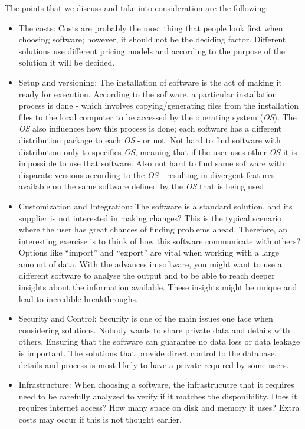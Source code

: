 \documentclass[ppgc,mestrado,English]{iiufrgs}
\begin{document}
The points that we discuss and take into consideration are the following:
\begin{itemize}
\item The costs: Costs are probably the most thing that people look first when choosing software; however, it should not be the deciding factor. Different solutions use different pricing models and according to the purpose of the solution it will be decided.

\item Setup and versioning: The installation of software is the act of making it ready for execution. According to the software, a particular installation process is done - which involves copying/generating files from the installation files to the local computer to be accessed by the operating system (\emph{OS}). The \emph{OS} also influences how this process is done; each software has a different distribution package to each \emph{OS} - or not. Not hard to find software with distribution only to specifics \emph{OS}, meaning that if the user uses other \emph{OS} it is impossible to use that software. Also not hard to find same software with disparate versions according to the \emph{OS} - resulting in divergent features available on the same software defined by the \emph{OS} that is being used.

\item Customization and Integration: The software is a standard solution, and its supplier is not interested in making changes? This is the typical scenario where the user has great chances of finding problems ahead. Therefore, an interesting exercise is to think of how this software communicate with others? Options like  ``import'' and ``export'' are vital when working with a large amount of data. With the advances in software, you might want to use a different software to analyse the output and to be able to reach deeper insights about the information available. These insights might be unique and lead to incredible breakthroughs.

\item Security and Control: Security is one of the main issues one face when considering solutions. Nobody wants to share private data and details with others. Ensuring that the software can guarantee no data loss or data leakage is important. The solutions that provide direct control to the database, details and process is most likely to have a private required by some users.

\item Infrastructure: When choosing a software, the infrastrucutre that it requires need to be carefully analyzed to verify if it matches the disponibility. Does it requires internet access? How many space on disk and memory it uses? Extra costs may occur if this is not thought earlier.


\end{itemize}
\end{document}
